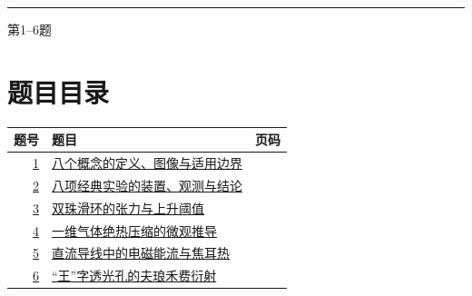 \documentclass[UTF8,fontset=fandol,a4paper,11pt]{ctexart}
\begin{document}

\thispagestyle{empty}\vspace*{22mm}

\par\vspace{12mm}

\par\vspace{12mm}

\par\vspace{9mm}

\noindent\textcolor{accent}{\rule{\linewidth}{1pt}}\par\vspace{9mm}

\noindent 第1--6题\par\vfill\clearpage

\section*{题目目录}

\begin{longtable}{@{}r p{113mm} r@{}}\toprule 题号 & 题目 & 页码\\\midrule

\hyperref[q:1]{1} & \hyperref[q:1]{八个概念的定义、图像与适用边界} & \pageref{q:1} \\

\hyperref[q:2]{2} & \hyperref[q:2]{八项经典实验的装置、观测与结论} & \pageref{q:2} \\

\hyperref[q:3]{3} & \hyperref[q:3]{双珠滑环的张力与上升阈值} & \pageref{q:3} \\

\hyperref[q:4]{4} & \hyperref[q:4]{一维气体绝热压缩的微观推导} & \pageref{q:4} \\

\hyperref[q:5]{5} & \hyperref[q:5]{直流导线中的电磁能流与焦耳热} & \pageref{q:5} \\

\hyperref[q:6]{6} & \hyperref[q:6]{“王”字透光孔的夫琅禾费衍射} & \pageref{q:6} \\

\bottomrule\end{longtable}

\clearpage
\end{document}
